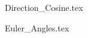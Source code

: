 \documentclass[a4paper, 12pt]{report}
\begin{document}
\begin{center}
\begin{comment}
\end{comment}
{Direction_Cosine.tex}
\begin{comment}
Start Level: Sections
End Level: Sections
Aditional Comments:

\end{comment}
{Euler_Angles.tex}
\begin{comment}
Start Level: Sections
End Level: Sections
Aditional Comments:

\end{comment}
\end{center}
\end{document}
